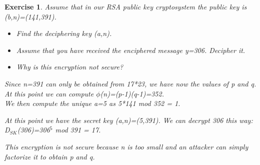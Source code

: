 \documentclass[a4paper, 12pt]{report}
\newtheorem{exercise}{\textbf{Exercise}}
\begin{document}
\begin{exercise}
	Assume that in our RSA public key cryptosystem the public key is (b,n)=(141,391).
	\begin{itemize}
		\item Find the deciphering key (a,n).
		\item Assume that you have received the enciphered message y=306. Decipher it.
		\item Why is this encryption not secure?
	\end{itemize}

	Since n=391 can only be obtained from 17*23, we have now the values of p and q.\\
	At this point we can compute $\phi$(n)=(p-1)(q-1)=352.\\
	We then compute the unique a=5 as 5*141 mod 352 = 1.
	
	At this point we have the secret key (a,n)=(5,391). We can decrypt 306 this way:\\
	D$_{SK}$(306)=306$^5$ mod 391 = 17.
	
	This encryption is not secure because n is too small and an attacker can simply factorize it to obtain p and q.
\end{exercise}
\end{document}
